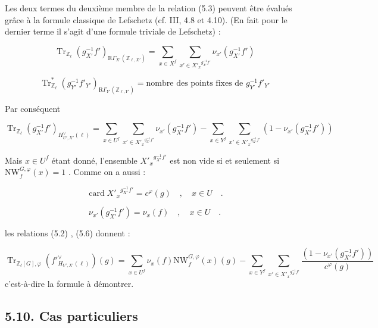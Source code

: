 \documentclass[11pt]{article}
\newcommand{\R}{\mathrm{R}}\newcommand{\RHomCore}{\mathrm{RHom}}
\providecommand{\Tr}{\operatorname{Tr}}
\providecommand{\Tr}{\operatorname{Tr}}
\providecommand{\Tr}{\operatorname{Tr}}
\providecommand{\R}{\mathrm R}
\providecommand{\Tr}{\operatorname{Tr}}
\providecommand{\bZ}{\mathbb Z}
\providecommand{\card}{\operatorname{card}}
\providecommand{\Tr}{\operatorname{Tr}}
\begin{document}
Les deux termes du deuxième membre de la relation (5.3) peuvent être évalués grâce à la formule classique de Lefschetz (cf. III, 4.8 et 4.10). (En fait pour le dernier terme il s'agit d'une formule triviale de Lefschetz) :

\begin{equation}\tag{5.4}
\Tr_{\bZ_\ell}(g_{X'}^{-1}f')_{\R\Gamma_{X'}(\bZ_{\ell,X'})} = \sum_{x \in X^f} \sum_{x' \in {X'_x}^{g_{X'}^{-1}f'}} \nu_{x'}(g_{X'}^{-1}f')
\end{equation}

\begin{equation}\tag{5.5}
\Tr^*_{\bZ_\ell}(g_{Y'}^{-1}f'_{Y'})_{\R\Gamma_{Y'}(\bZ_{\ell,Y'})} = \text{nombre des points fixes de } g_{Y'}^{-1}f'_{Y'}
\end{equation}

Par conséquent

\begin{equation}\tag{5.6}
\Tr_{\bZ_\ell}(g_{X'}^{-1}f')_{H^\vee_{U',X'}(\ell)} = \sum_{x \in U^f} \sum_{x' \in {X'_x}^{g_{X'}^{-1}f'}} \nu_{x'}(g_{X'}^{-1}f') - \sum_{x \in Y^f} \sum_{x' \in {X'_x}^{g_{X'}^{-1}f'}} (1 - \nu_{x'}(g_{X'}^{-1}f'))
\end{equation}

Mais $x \in U^f$ étant donné, l'ensemble ${X'_x}^{g_{X'}^{-1}f'}$ est non vide si et seulement si $\mathrm{NW}_{f}^{G,\varphi}(x) = 1$ . Comme on a aussi :

\begin{equation}\tag{5.7}
\card {X'_x}^{g_{X'}^{-1}f'} = c^\varphi(g) \quad , \quad x \in U \quad .
\end{equation}

\begin{equation}\tag{5.8}
\nu_{x'}(g_{X'}^{-1}f') = \nu_x(f) \quad , \quad x \in U \quad .
\end{equation}

les relations (5.2) , (5.6) donnent :

\begin{equation}\tag{5.9}
\Tr_{\bZ_\ell[G],\varphi}(f'^\vee_{H_{U',X'}(\ell)})(g) = \sum_{x \in U^f} \nu_x(f) \mathrm{NW}_f^{G,\varphi}(x)(g) - \sum_{x \in Y^f} \sum_{x' \in {X'_x}^{g_{X'}^{-1}f'}} \frac{(1 - \nu_{x'}(g_{X'}^{-1}f'))}{c^\varphi(g)}
\end{equation}
c'est-à-dire la formule à démontrer.

\subsection*{5.10. Cas particuliers}
\end{document}
